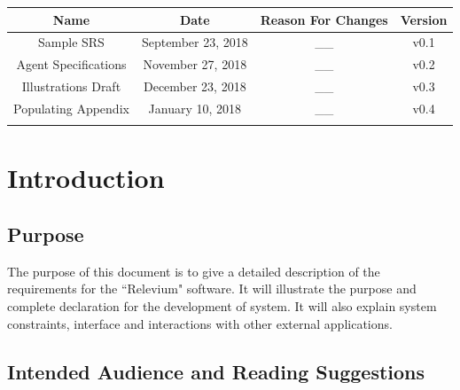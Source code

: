 \documentclass{scrreprt}
\begin{document}
\begin{center}
    \begin{tabular}{|c|c|c|c|}
        \hline
	    Name & Date & Reason For Changes & Version\\
        \hline
	   Sample SRS & September 23, 2018 & __ & v0.1\\
        \hline
        Agent Specifications & November 27, 2018 & __ & v0.2\\
        \hline
        Illustrations Draft & December 23, 2018 & __ & v0.3\\
        \hline
        Populating Appendix & January 10, 2018 & __ & v0.4\\
        \hline
	   & & & \\
        \hline
    \end{tabular}
\end{center}

\chapter{Introduction}

\section{Purpose}

The purpose of this document is to give a detailed description of the requirements for the ``Relevium" software. It will illustrate the purpose and complete declaration for the development of system. It will also explain system constraints, interface and interactions with other external applications.



\section{Intended Audience and Reading Suggestions}
\end{document}
